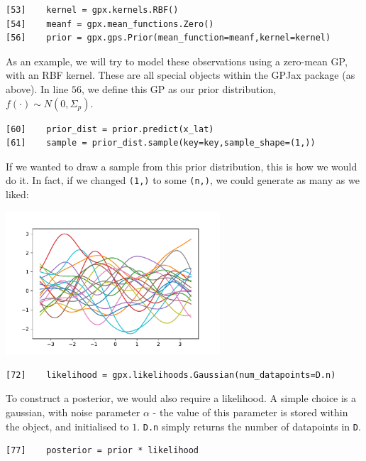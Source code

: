 \documentclass[12pt]{article}
\begin{document}
    \begin{verbatim}[53]    kernel = gpx.kernels.RBF()
[54]    meanf = gpx.mean_functions.Zero()
[56]    prior = gpx.gps.Prior(mean_function=meanf,kernel=kernel)\end{verbatim}
    \begin{bestbox}
        As an example, we will try to model these observations using a zero-mean GP, with an RBF kernel. These are all special objects within the GPJax package (as above). In line $56$, we define this GP as our prior distribution, $f(\cdot)\sim N(0,\Sigma_p)$.
    \end{bestbox}
    \begin{verbatim}[60]    prior_dist = prior.predict(x_lat)
[61]    sample = prior_dist.sample(key=key,sample_shape=(1,))\end{verbatim}
    \begin{bestbox}
        If we wanted to draw a sample from this prior distribution, this is how we would do it. In fact, if we changed \verb|(1,)| to some \verb|(n,)|, we could generate as many as we liked:
        \begin{center}
            \includegraphics[width=8cm]{gpjax_example_samples.pdf}
        \end{center}
    \end{bestbox}
    \begin{verbatim}[72]    likelihood = gpx.likelihoods.Gaussian(num_datapoints=D.n)\end{verbatim}
    \begin{bestbox}
        To construct a posterior, we would also require a likelihood. A simple choice is a gaussian, with noise parameter $\alpha$ - the value of this parameter is stored within the object, and initialised to $1$. \verb|D.n| simply returns the number of datapoints in \verb|D|.
    \end{bestbox}
    \begin{verbatim}[77]    posterior = prior * likelihood\end{verbatim}
\end{document}
